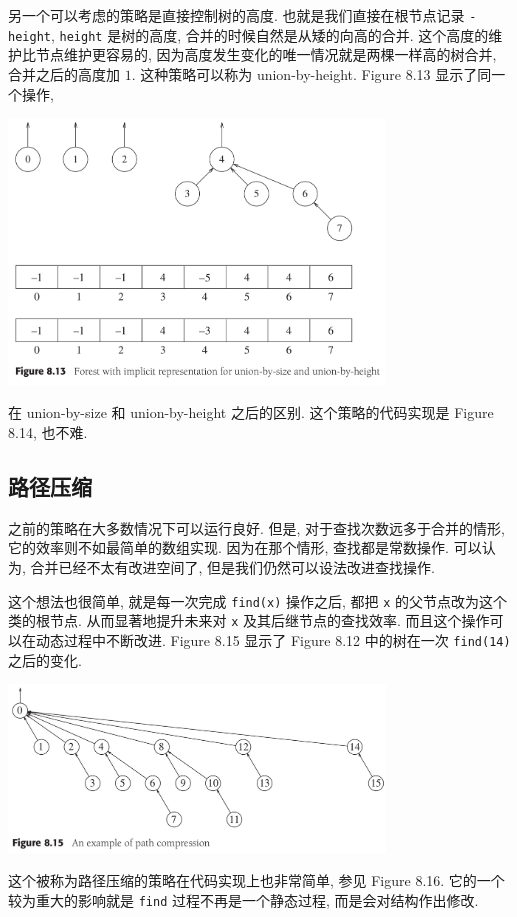 \documentclass[a4paper]{ctexart}
\theoremstyle{definition}
\theoremstyle{definition}
\begin{document}
另一个可以考虑的策略是直接控制树的高度. 也就是我们直接在根节点记录 \verb|-height|, \verb|height| 是树的高度, 
合并的时候自然是从矮的向高的合并. 这个高度的维护比节点维护更容易的, 
因为高度发生变化的唯一情况就是两棵一样高的树合并, 合并之后的高度加 $1$. 
这种策略可以称为 union-by-height. Figure 8.13 显示了同一个操作,
\begin{center}
  \includegraphics[width=0.75\textwidth]{images/FIG8_13.png}
\end{center} 
在 union-by-size 和 union-by-height 之后的区别. 
这个策略的代码实现是 Figure 8.14, 也不难.

\subsection{路径压缩}

之前的策略在大多数情况下可以运行良好. 但是, 对于查找次数远多于合并的情形, 
它的效率则不如最简单的数组实现. 因为在那个情形, 查找都是常数操作. 
可以认为, 合并已经不太有改进空间了, 但是我们仍然可以设法改进查找操作. 

这个想法也很简单, 就是每一次完成 \verb|find(x)| 操作之后, 都把 \verb|x| 的父节点改为这个类的根节点. 
从而显著地提升未来对 \verb|x| 及其后继节点的查找效率. 
而且这个操作可以在动态过程中不断改进. Figure 8.15 显示了 Figure 8.12 
中的树在一次 \verb|find(14)| 之后的变化. 
\begin{center}
  \includegraphics[width=0.75\textwidth]{images/FIG8_15.png}
\end{center} 
这个被称为路径压缩的策略在代码实现上也非常简单, 
参见 Figure 8.16. 它的一个较为重大的影响就是 \verb|find| 过程不再是一个静态过程, 而是会对结构作出修改.  
\end{document}
